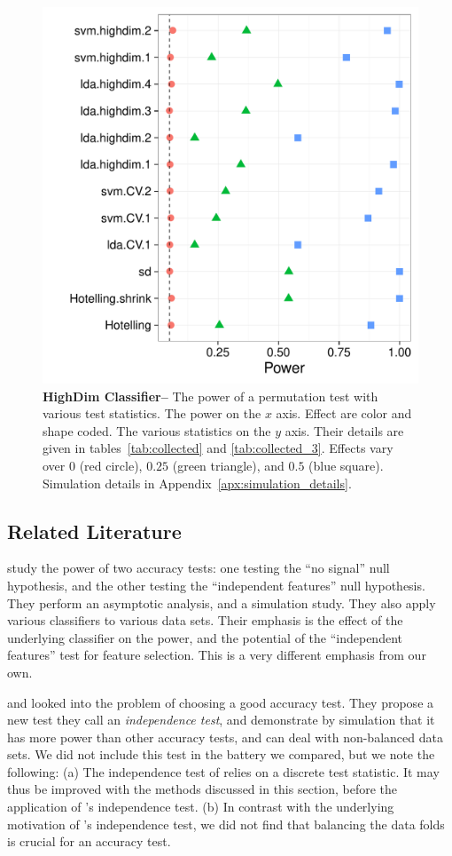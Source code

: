\documentclass[12pt,a4paper]{article}
\theoremstyle{definition}
\begin{document}
\begin{figure}[ht]
\centering
	  \includegraphics[width=0.7\linewidth]{"art/2016-08-15 20:07:55"}
	  \caption{
\textbf{HighDim Classifier--} 
		The power of a permutation test with various test statistics. 
		The power on the $x$ axis. 
		Effect are color and shape coded. 
		The various statistics on the $y$ axis. 
		Their details are given in tables~\ref{tab:collected} and \ref{tab:collected_3}. 
		Effects vary over $0$ (red circle), $0.25$ (green triangle), and $0.5$ (blue square). 
		Simulation details in Appendix~\ref{apx:simulation_details}.
} 
	\label{fig:highdim}
\end{figure}






\subsection{Related Literature}
\cite{ojala_permutation_2010} study the power of two accuracy tests: one testing the ``no signal'' null hypothesis, and the other testing the ``independent features'' null hypothesis. 
They perform an asymptotic analysis, and a simulation study. 
They also apply various classifiers to various data sets. 
Their emphasis is the effect of the underlying classifier on the power, and the potential of the ``independent features'' test for feature selection.
This is a very different emphasis from our own.


\cite{olivetti_induction_2012} and \cite{olivetti_statistical_2014} looked into the problem of choosing a good accuracy test. 
They propose a new test they call an \emph{independence test}, and demonstrate by simulation that it has more power than other accuracy tests, and can deal with non-balanced data sets. 
We did not include this test in the battery we compared, but we note the following: 
(a) The independence test of \cite{olivetti_induction_2012} relies on a discrete test statistic. It may thus be improved with the methods discussed in this section, before the application of \cite{olivetti_induction_2012}'s independence test. 
(b) In contrast with the underlying motivation of \cite{olivetti_induction_2012}'s independence test, we did not find that balancing the data folds is crucial for an accuracy test. 
\end{document}
